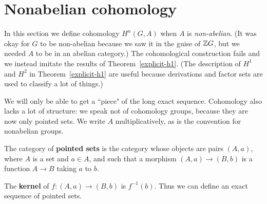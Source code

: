\section{Nonabelian cohomology}
In this section we define cohomology $H^n(G,A)$ when $A$ is {\it non-abelian}. (It was okay for $G$ to be non-abelian because we saw it in the guise of $\mathbb{Z} G$, but we needed $A$ to be in an abelian category.) The cohomological construction fails and we instead imitate the results of Theorem~\ref{explicit-h1}. (The description of $H^1$ and $H^2$ in Theorem~\ref{explicit-h1} are useful because derivations and factor sets are used to classify a lot of things.)

We will only be able to get a ``piece" of the long exact sequence. Cohomology also lacks a lot of structure: we speak not of cohomology groups, because they are now only pointed sets. We write $A$ multiplicatively, as is the convention for nonabelian groups.

\begin{df}
The category of \textbf{pointed sets} is the category whose objects are pairs $(A,a)$, where $A$ is a set and $a\in A$, and such that a morphism $(A,a)\to (B,b)$ is a function $A\to B$ taking $a$ to $b$.

The \textbf{kernel} of $f:(A,a)\to (B,b)$ is $f^{-1}(b)$. Thus we can define an exact sequence of pointed sets.
\end{df}

